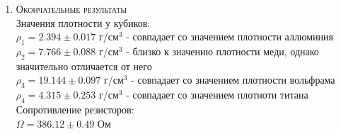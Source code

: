 \documentclass[12pt]{article}
\begin{document}
\begin{enumerate}
    
    \item \large\textsc{Окончательные результаты} \\
    	Значения плотности у кубиков: \\
		$\rho_1 = 2.394 \pm 0.017$ г/см$^3$ - совпадает со значением плотности аллюминия\\
		$\rho_2 = 7.766 \pm 0.088$ г/см$^3$ - близко к значению плотности меди, однако значительно отличается от него\\
		$\rho_3 = 19.144 \pm 0.097$ г/см$^3$ - совпадает со значением плотности вольфрама\\
		$\rho_4 = 4.315 \pm 0.253$ г/см$^3$ - совпадает со значением плотноти титана\\ 
		
		Сопротивление резисторов: \\
		$ \Omega = 386.12 \pm 0.49 $ Ом
		
		


\end{enumerate}
\end{document}
